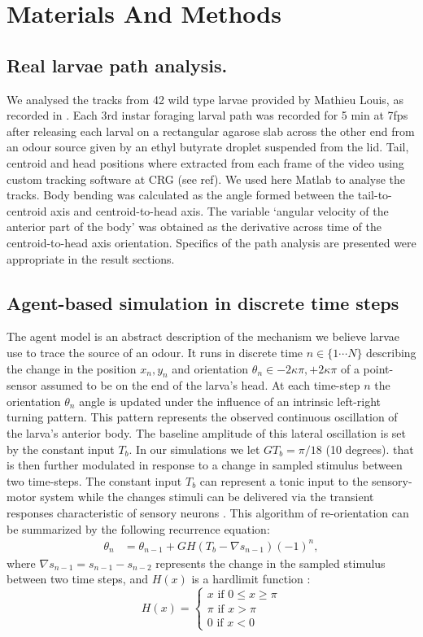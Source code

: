 \documentclass[10pt,a4paper]{article}
\begin{document}
\section{Materials And Methods}
\subsection{Real larvae path analysis.}
We analysed the tracks from 42 wild type larvae provided by Mathieu Louis, as recorded in \cite{gomez2011active}. Each 3rd instar foraging larval path was recorded for 5 min at 7fps after releasing each larval on a rectangular agarose slab across the other end from an odour source given by an ethyl butyrate droplet suspended from the lid. Tail, centroid and head positions where extracted from each frame of the video using custom tracking software at CRG (see ref). We used here Matlab to analyse the tracks. Body bending was calculated as the angle formed between the tail-to-centroid axis and centroid-to-head axis. The variable ‘angular velocity of the anterior part of the body’ was obtained as the derivative across time of the centroid-to-head axis orientation. Specifics of the path analysis are presented were appropriate in the result sections. 

\subsection{Agent-based simulation in discrete time steps}
The agent model is an abstract description of the mechanism we believe larvae use to trace the source of an odour. It runs in discrete time $n \in \{1 \cdots N\}$ describing the change in the position $x_n,y_n$ and orientation $\theta_n \in {-2 \kappa \pi,+2 \kappa \pi}$ of a point-sensor assumed to be on the end of the larva's head. At each time-step $n$ the orientation $\theta_n$ angle is updated under the influence of an intrinsic left-right turning pattern. This pattern represents the observed continuous oscillation of the larva's anterior body. The baseline amplitude of this lateral oscillation is set by the constant input $T_b$. In our simulations we let $G T_b = \pi/18$ (10 degrees). that is then further modulated in response to a change in sampled stimulus between two time-steps. The constant input $T_b$ can represent a tonic input to the sensory-motor system while the changes stimuli can be delivered via the transient responses characteristic of sensory neurons \citep{nagel2011biophysical}.
 This algorithm of re-orientation can be summarized by the following recurrence equation:
\begin{align}
\theta_n &= \theta_{n-1} + G H(T_b - \nabla s_{n-1}){(-1)}^n,
\label{eqn:Discretemodel}
\end{align}
where  $\nabla s_{n-1}  = s_{n-1} - s_{n-2}$ represents the change in the sampled stimulus between two time steps, and $H(x)$ is a hardlimit function :
\begin{equation}
H(x) =
\begin{cases}
x \mbox{ if } 0 \leq x \geq \pi \\
\pi \mbox{ if } x > \pi  \\
0 \mbox{ if } x < 0 
\end{cases}
\end{equation}
\end{document}
